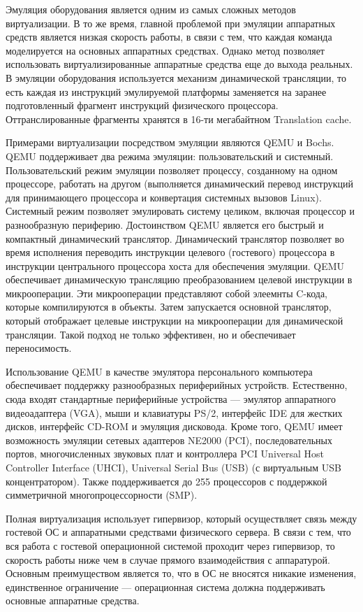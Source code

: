 Эмуляция оборудования является одним из самых сложных методов виртуализации.
В то же время, главной проблемой при эмуляции аппаратных средств является низкая скорость работы, в связи с тем, что каждая команда моделируется на основных аппаратных средствах. 
Однако метод позволяет использовать виртуализированные аппаратные средства еще до выхода реальных.
В эмуляции оборудования используется механизм динамической трансляции, то есть каждая из инструкций эмулируемой платформы заменяется на заранее подготовленный фрагмент инструкций физического процессора.
Оттранслированные фрагменты хранятся в 16-ти мегабайтном Translation cache.

Примерами виртуализации посредством эмуляции являются QEMU и Bochs.
QEMU поддерживает два режима эмуляции: пользовательский и системный.
Пользовательский режим эмуляции позволяет процессу, созданному на одном процессоре, работать на другом (выполняется динамический перевод инструкций для принимающего процессора и конвертация системных вызовов Linux).
Системный режим позволяет эмулировать систему целиком, включая процессор и разнообразную периферию.
Достоинством QEMU является его быстрый и компактный динамический транслятор.
Динамический транслятор позволяет во время исполнения переводить инструкции целевого (гостевого) процессора в инструкции центрального процессора хоста для обеспечения эмуляции.
QEMU обеспечивает динамическую трансляцию преобразованием целевой инструкции в микрооперации.
Эти микрооперации представляют собой элеемнты C-кода, которые компилируются в объекты.
Затем запускается основной транслятор, который отображает целевые инструкции на микрооперации для динамической трансляции.
Такой подход не только эффективен, но и обеспечивает переносимость.

Использование QEMU в качестве эмулятора персонального компьютера обеспечивает поддержку разнообразных периферийных устройств.
Естественно, сюда входят стандартные периферийные устройства --- эмулятор аппаратного видеоадаптера (VGA), мыши и клавиатуры PS/2, интерфейс IDE для жестких дисков, интерфейс CD-ROM и эмуляция дисковода.
Кроме того, QEMU имеет возможность эмуляции сетевых адаптеров NE2000 (PCI), последовательных портов, многочисленных звуковых плат и контроллера PCI Universal Host Controller Interface (UHCI), Universal Serial Bus (USB) (с виртуальным USB концентратором).
Также поддерживается до 255 процессоров с поддержкой симметричной многопроцессорности (SMP).

Полная виртуализация использует гипервизор, который осуществляет связь между гостевой ОС и аппаратными средствами физического сервера.
В связи с тем, что вся работа с гостевой операционной системой проходит через гипервизор, то скорость работы ниже чем в случае прямого взаимодействия с аппаратурой.
Основным преимуществом является то, что в ОС не вносятся никакие изменения, единственное ограничение --- операционная система должна поддерживать основные аппаратные средства.


